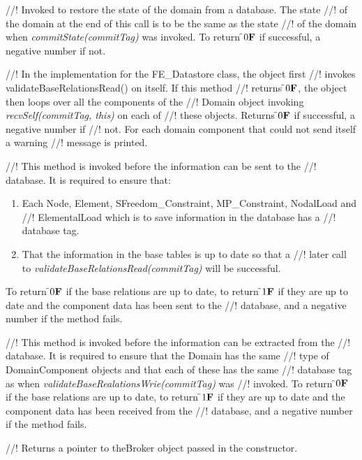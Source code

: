 //! Invoked to restore the state of the domain from a database. The state
//! of the domain at the end of this call is to be the same as the state
//! of the domain when {\em commitState(commitTag)} was invoked. To return
\f$0{\bf F}$ if successful, a negative number if not. 

//! In the implementation for the FE\_Datastore class, the object first
//! invokes validateBaseRelationsRead() on itself. If this method 
//! returns \f$0{\bf F}$, the object then loops over all the components of the
//! Domain object invoking {\em recvSelf(commitTag, this)} on each of
//! these objects. Returns \f$0{\bf F}$ if successful, a negative number if
//! not. For each domain component that could not send itself a warning
//! message is printed. 


//! This method is invoked before the information can be sent to the
//! database. It is required to ensure that: \begin{enumerate} 
\item Each Node, Element, SFreedom\_Constraint, MP\_Constraint, NodalLoad and
//! ElementalLoad which is to save information in the database has a
//! database tag.
\item That the information in the base tables is up to date so that a
//! later call to {\em validateBaseRelationsRead(commitTag)} will be successful.
\end{enumerate}
\noindent To return \f$0{\bf F}$ if the base relations are up to date, to return
\f$1{\bf F}$ if they are up to date and the component data has been sent to the
//! database, and a negative number if the method fails.

//! This method is invoked before the information can be extracted from the
//! database. It is required to ensure that the Domain has the same
//! type of DomainComponent objects and that each of these has the same
//! database tag as when {\em validateBaseRealationsWrie(commitTag)} was
//! invoked.  To return \f$0{\bf F}$ if the base relations are up to date, to return
\f$1{\bf F}$ if they are up to date and the component data has been received from the
//! database, and a negative number if the method fails.

//! Returns a pointer to \p theBroker object passed in the constructor. 
